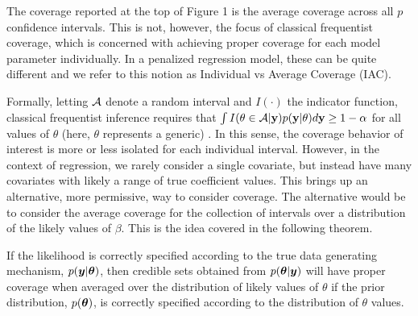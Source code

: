 The coverage reported at the top of Figure 1 is the average coverage across all $p$ confidence intervals. This is not, however, the focus of classical frequentist coverage, which is concerned with achieving proper coverage for each model parameter individually. In a penalized regression model, these can be quite different and we refer to this notion as Individual vs Average Coverage (IAC).


Formally, letting $\mathcal{A}$ denote a random interval and $I(\cdot)$ the indicator function, classical frequentist inference requires that $\int I(\theta \in \mathcal{A} | \mathbf{y}) p(\mathbf{y} | \theta) d\mathbf{y} \ge 1 - \alpha$ for all values of $\theta$ (here, $\theta$ represents a generic) . In this sense, the coverage behavior of interest is more or less isolated for each individual interval. However, in the context of regression, we rarely consider a single covariate, but instead have many covariates with likely a range of true coefficient values. This brings up an alternative, more permissive, way to consider coverage. The alternative would be to consider the average coverage for the collection of intervals over a distribution of the likely values of $\beta$. This is the idea covered in the following theorem.

\begin{thm}
  \label{Thm:bcc}
  If the likelihood is correctly specified according to the true data generating mechanism, $p(\boldsymbol{y} | \boldsymbol{\theta})$, then credible sets obtained from $p(\boldsymbol{\theta}|\boldsymbol{y})$ will have proper coverage when averaged over the distribution of likely values of $\theta$ if the prior distribution, $p(\boldsymbol{\theta})$, is correctly specified according to the distribution of $\theta$ values.
\end{thm}

